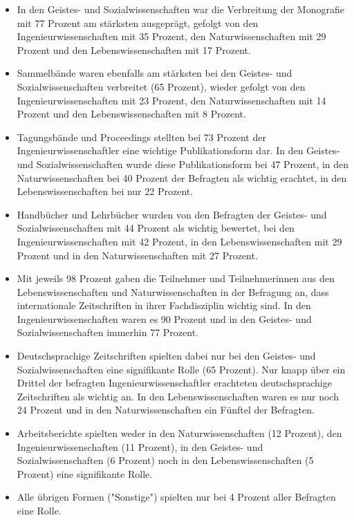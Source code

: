 \begin{itemize}
\item In den Geistes- und Sozialwissenschaften war die Verbreitung der Monografie mit 77 Prozent am stärksten ausgeprägt, gefolgt von den Ingenieurwissenschaften mit 35 Prozent, den Naturwissenschaften mit 29 Prozent und den Lebenswissenschaften mit 17 Prozent.
\item Sammelbände waren ebenfalls am stärksten bei den Geistes- und Sozialwissenschaften verbreitet (65 Prozent), wieder gefolgt von den Ingenieurwissenschaften mit 23 Prozent, den Naturwissenschaften mit 14 Prozent und den Lebenswissenschaften mit 8 Prozent.
\item Tagungsbände und Proceedings stellten bei 73 Prozent der Ingenieurwissenschaftler eine wichtige Publikationsform dar. In den Geistes- und Sozialwissenschaften  wurde diese Publikationsform bei 47 Prozent, in den Naturwissenschaften bei 40 Prozent der Befragten als wichtig erachtet, in den Lebenswissenschaften bei nur 22 Prozent.
\item Handbücher und Lehrbücher wurden von den Befragten der Geistes- und Sozialwissenschaften mit 44 Prozent als wichtig bewertet, bei den Ingenieurwissenschaften mit 42 Prozent, in den Lebenswissenschaften mit 29 Prozent und in den Naturwissenschaften mit 27 Prozent.
\item Mit jeweils 98 Prozent gaben die Teilnehmer und Teilnehmerinnen aus den Lebenswissenschaften und Naturwissenschaften in der Befragung an, dass internationale Zeitschriften in ihrer Fachdisziplin wichtig sind. In den Ingenieurwissenschaften waren es 90 Prozent und in den Geistes- und Sozialwissenschaften immerhin 77 Prozent.
\item Deutschsprachige Zeitschriften spielten dabei nur bei den Geistes- und Sozialwissenschaften eine signifikante Rolle (65 Prozent). Nur knapp über ein Drittel der befragten Ingenieurwissenschaftler erachteten deutschsprachige Zeitschriften als wichtig an. In den Lebenswissenschaften waren es nur noch 24 Prozent und in den Naturwissenschaften ein Fünftel der Befragten.
\item  Arbeitsberichte spielten weder in den Naturwissenschaften (12 Prozent), den Ingenieurwissenschaften (11 Prozent), in den Geistes- und Sozialwissenschaften (6 Prozent) noch in den Lebenswissenschaften (5 Prozent) eine signifikante Rolle.
\item Alle übrigen Formen ("Sonstige") spielten nur bei 4 Prozent aller Befragten eine Rolle.
\end{itemize}


